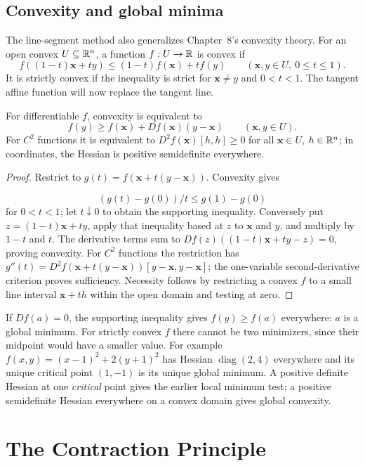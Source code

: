 \subsection{Convexity and global minima}
The line-segment method also generalizes Chapter~8's convexity theory.
For an open convex $U\subseteq\mathbb{R}^n$, a function $f:U\to\mathbb{R}$ is convex if
\[
f((1-t)\mathbf{x}+ty)\leq(1-t)f(\mathbf{x})+tf(y)\qquad(\mathbf{x},y\in U,\ 0\leq t\leq1).
\]
It is strictly convex if the inequality is strict for $\mathbf{x}\ne y$ and
$0<t<1$. The tangent affine function will now replace the tangent line.
\begin{proposition}\label{prop:multivariable-convexity}
For differentiable $f$, convexity is equivalent to
\[
f(y)\geq f(\mathbf{x})+Df(\mathbf{x})(y-\mathbf{x})\qquad(\mathbf{x},y\in U).
\]
For $C^2$ functions it is equivalent to
$D^2f(\mathbf{x})[h,h]\geq0$ for all $\mathbf{x}\in U$, $h\in\mathbb{R}^n$;
in coordinates, the Hessian is positive semidefinite everywhere.
\end{proposition}
\begin{proof}
Restrict to $g(t)=f(\mathbf{x}+t(y-\mathbf{x}))$. Convexity gives

\[
(g(t)-g(0))/t\leq g(1)-g(0)
\]
 for $0<t<1$; let $t\downarrow0$
to obtain the supporting inequality. Conversely put $z=(1-t)\mathbf{x}+ty$,
apply that inequality based at $z$ to $\mathbf{x}$ and $y$, and multiply by
$1-t$ and $t$. The derivative terms sum to
$Df(z)((1-t)\mathbf{x}+ty-z)=0$, proving convexity.
For $C^2$ functions the restriction has
$g''(t)=D^2f(\mathbf{x}+t(y-\mathbf{x}))[y-\mathbf{x},y-\mathbf{x}]$; the one-variable second-derivative
criterion proves sufficiency. Necessity follows by restricting a convex
$f$ to a small line interval $\mathbf{x}+th$ within the open domain and testing at zero.
\end{proof}
If $Df(a)=0$, the supporting inequality gives $f(y)\geq f(a)$ everywhere:
$a$ is a global minimum. For strictly convex $f$ there cannot be two
minimizers, since their midpoint would have a smaller value.
For example $f(x,y)=(x-1)^2+2(y+1)^2$ has Hessian
$\operatorname{diag}(2,4)$ everywhere and its unique critical point
$(1,-1)$ is its unique global minimum. A positive definite Hessian at
one \emph{critical} point gives the earlier local minimum test; a positive
semidefinite Hessian everywhere on a convex domain gives global convexity.


\section{The Contraction Principle}

